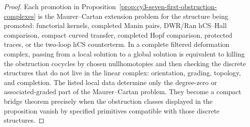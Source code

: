 \begin{proof}
Each promotion in Proposition~\ref{prop:cy3-seven-first-obstruction-complexes}
is the Maurer--Cartan extension problem for the structure being
promoted: functorial kernels, completed Manin pairs, DWR/Ran
hCS--Hall comparison, compact curved transfer, completed Hopf
comparison, protected traces, or the two-loop hCS counterterm. In a
complete filtered deformation complex, passing from a local solution to
a global solution is equivalent to killing the obstruction cocycles by
chosen nullhomotopies and then checking the discrete structures that do
not live in the linear complex: orientation, grading, topology, and
completion. The listed local data determine only the degree-zero or
associated-graded part of the Maurer--Cartan problem. They become a
compact bridge theorem precisely when the obstruction classes displayed
in the proposition vanish by specified primitives compatible with those
discrete structures.
\end{proof}

